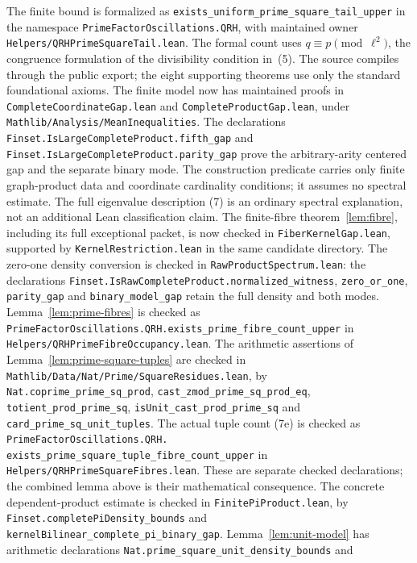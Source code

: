\documentclass[11pt]{article}
\begin{document}
The finite bound is formalized as
\texttt{exists\_uniform\_prime\_square\_tail\_upper} in the namespace
\texttt{PrimeFactorOscillations.QRH}, with maintained owner
\texttt{Helpers/QRHPrimeSquareTail.lean}.
The formal count uses \(q\equiv p\pmod{\ell^2}\), the congruence formulation
of the divisibility condition in~(5). The source compiles through the public
export; the eight supporting theorems use only the standard foundational axioms.
The finite model now has maintained proofs in
\texttt{CompleteCoordinateGap.lean} and \texttt{CompleteProductGap.lean},
under \texttt{Mathlib/Analysis/MeanInequalities}.
The declarations \texttt{Finset.IsLargeCompleteProduct.fifth\_gap} and
\texttt{Finset.IsLargeCompleteProduct.parity\_gap} prove the arbitrary-arity
centered gap and the separate binary mode.
The construction predicate carries only finite graph-product data and
coordinate cardinality conditions; it assumes no spectral estimate.
The full eigenvalue description (7) is an ordinary spectral explanation,
not an additional Lean classification claim.
The finite-fibre theorem~\ref{lem:fibre}, including its full exceptional
packet, is now checked in \texttt{FiberKernelGap.lean}, supported by
\texttt{KernelRestriction.lean} in the same candidate directory.
The zero-one density conversion is checked in
\texttt{RawProductSpectrum.lean}: the declarations
\texttt{Finset.IsRawCompleteProduct.normalized\_witness},
\texttt{zero\_or\_one}, \texttt{parity\_gap} and
\texttt{binary\_model\_gap} retain the full density and both modes.
Lemma~\ref{lem:prime-fibres} is checked as
\texttt{PrimeFactorOscillations.QRH.exists\_prime\_fibre\_count\_upper}
in \texttt{Helpers/QRHPrimeFibreOccupancy.lean}.
The arithmetic assertions of Lemma~\ref{lem:prime-square-tuples} are
checked in \texttt{Mathlib/Data/Nat/Prime/SquareResidues.lean}, by
\texttt{Nat.coprime\_prime\_sq\_prod},
\texttt{cast\_zmod\_prime\_sq\_prod\_eq},
\texttt{totient\_prod\_prime\_sq},
\texttt{isUnit\_cast\_prod\_prime\_sq} and
\texttt{card\_prime\_sq\_unit\_tuples}.
The actual tuple count (7e) is checked as
\texttt{PrimeFactorOscillations.QRH.}
\texttt{exists\_prime\_square\_tuple\_fibre\_count\_upper}
in \texttt{Helpers/QRHPrimeSquareFibres.lean}.
These are separate checked declarations; the combined lemma above is
their mathematical consequence.
The concrete dependent-product estimate is checked in
\texttt{FinitePiProduct.lean}, by
\texttt{Finset.completePiDensity\_bounds} and
\texttt{kernelBilinear\_complete\_pi\_binary\_gap}.
Lemma~\ref{lem:unit-model} has arithmetic declarations
\texttt{Nat.prime\_square\_unit\_density\_bounds} and
\end{document}
